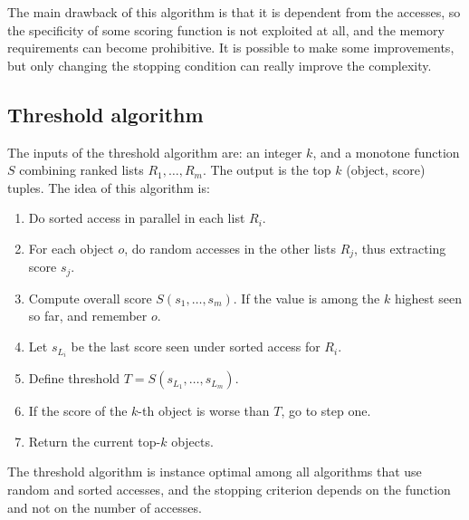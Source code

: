 \documentclass[12pt, a4paper]{report}
\begin{document}
    The main drawback of this algorithm is that it is dependent from the accesses, so the specificity of some scoring function is not exploited
    at all, and the memory requirements can become prohibitive. It is possible to make 
    some improvements, but only changing the stopping condition can really improve the complexity. 

    \subsection{Threshold algorithm}
    The inputs of the threshold algorithm are: an integer $k$, and a monotone function $S$ combining ranked lists $R_1,\dots,R_m$. 
    The output is the top $k$ (object, score) tuples. The idea of this algorithm is: 
    \begin{enumerate}
        \item Do sorted access in parallel in each list $R_i$. 
        \item For each object $o$, do random accesses in the other lists $R_j$, thus extracting score $s_j$. 
        \item Compute overall score $S(s_1, \dots, s_m)$. If the value is among the $k$ highest seen so far, and remember $o$. 
        \item Let $s_{L_i}$ be the last score seen under sorted access for $R_i$. 
        \item Define threshold $T=S(s_{L_1}, \dots, s_{L_m})$. 
        \item If the score of the $k$-th object is worse than $T$, go to step one. 
        \item Return the current top-$k$ objects. 
    \end{enumerate}
    The threshold algorithm is instance optimal among all algorithms that use random and sorted accesses, and the stopping criterion depends 
    on the function and not on the number of accesses. 
\end{document}

